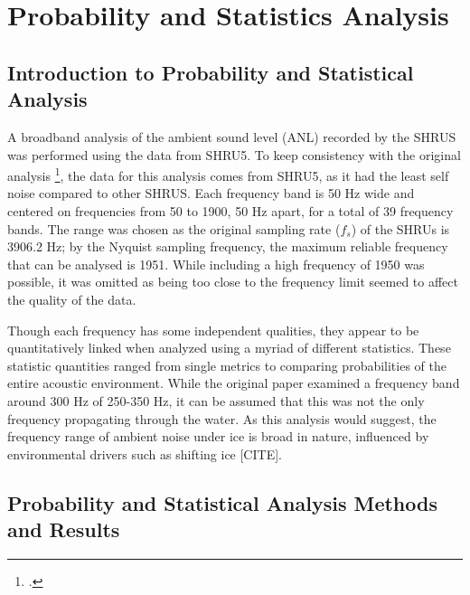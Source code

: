 
\chapter{Probability and Statistics Analysis}

\section{Introduction to Probability and Statistical Analysis}

 A broadband analysis of the ambient sound level (ANL) recorded by the SHRUS was performed using the data from SHRU5. To keep consistency with the original analysis \footcite[author]{Bonnel2021}, the data for this analysis comes from SHRU5, as it had the least self noise compared to other SHRUS. Each frequency band is 50 Hz wide and centered on frequencies from 50 to 1900, 50 Hz apart, for a total of 39 frequency bands. The range was chosen as the original sampling rate ($f_{s}$) of the SHRUs is  3906.2 Hz; by the Nyquist sampling frequency, the maximum reliable frequency that can be analysed is 1951. While including a high frequency of 1950 was possible, it was omitted as being too close to the frequency limit seemed to affect the quality of the data.

Though each frequency has some independent qualities, they appear to be quantitatively linked when analyzed using a myriad of different statistics. These statistic quantities ranged from single metrics to comparing probabilities of the entire acoustic environment. While the original paper examined a frequency band around 300 Hz of 250-350 Hz, it can be assumed that this was not the only frequency propagating through the water. As this analysis would suggest, the frequency range of ambient noise under ice is broad in nature, influenced by environmental drivers such as shifting ice [CITE]. 




\section{Probability and Statistical Analysis Methods and Results}

